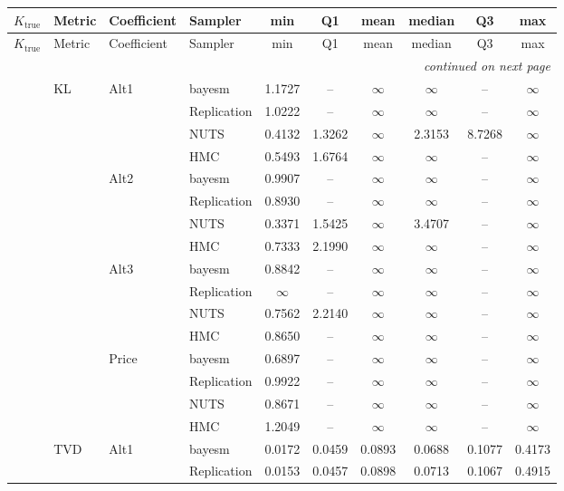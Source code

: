 \begin{longtable}{clllcccccc}
\toprule
$K_{\text{true}}$ & Metric & Coefficient & Sampler & min & Q1 & mean & median & Q3 & max \\
\midrule
\endfirsthead
\toprule
$K_{\text{true}}$ & Metric & Coefficient & Sampler & min & Q1 & mean & median & Q3 & max \\
\midrule
\endhead
\midrule
\multicolumn{10}{r}{\emph{continued on next page}} \\
\endfoot
\bottomrule
\endlastfoot
1 & KL & Alt1 & bayesm & 1.1727 & {--} & $\infty$ & $\infty$ & {--} & $\infty$ \\
 &  &  & Replication & 1.0222 & {--} & $\infty$ & $\infty$ & {--} & $\infty$ \\
 &  &  & NUTS & 0.4132 & 1.3262 & $\infty$ & 2.3153 & 8.7268 & $\infty$ \\
 &  &  & HMC & 0.5493 & 1.6764 & $\infty$ & $\infty$ & {--} & $\infty$ \\
 &  & Alt2 & bayesm & 0.9907 & {--} & $\infty$ & $\infty$ & {--} & $\infty$ \\
 &  &  & Replication & 0.8930 & {--} & $\infty$ & $\infty$ & {--} & $\infty$ \\
 &  &  & NUTS & 0.3371 & 1.5425 & $\infty$ & 3.4707 & {--} & $\infty$ \\
 &  &  & HMC & 0.7333 & 2.1990 & $\infty$ & $\infty$ & {--} & $\infty$ \\
 &  & Alt3 & bayesm & 0.8842 & {--} & $\infty$ & $\infty$ & {--} & $\infty$ \\
 &  &  & Replication & $\infty$ & {--} & $\infty$ & $\infty$ & {--} & $\infty$ \\
 &  &  & NUTS & 0.7562 & 2.2140 & $\infty$ & $\infty$ & {--} & $\infty$ \\
 &  &  & HMC & 0.8650 & {--} & $\infty$ & $\infty$ & {--} & $\infty$ \\
 &  & Price & bayesm & 0.6897 & {--} & $\infty$ & $\infty$ & {--} & $\infty$ \\
 &  &  & Replication & 0.9922 & {--} & $\infty$ & $\infty$ & {--} & $\infty$ \\
 &  &  & NUTS & 0.8671 & {--} & $\infty$ & $\infty$ & {--} & $\infty$ \\
 &  &  & HMC & 1.2049 & {--} & $\infty$ & $\infty$ & {--} & $\infty$ \\
 & TVD & Alt1 & bayesm & 0.0172 & 0.0459 & 0.0893 & 0.0688 & 0.1077 & 0.4173 \\
 &  &  & Replication & 0.0153 & 0.0457 & 0.0898 & 0.0713 & 0.1067 & 0.4915 \\

\end{longtable}
